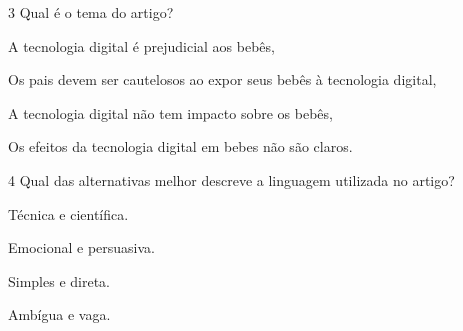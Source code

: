 \num{3} Qual é o tema do artigo?

\begin{escolha}
\item A tecnologia digital é prejudicial aos bebês,
\item Os pais devem ser cautelosos ao expor seus bebês à tecnologia
digital,
\item A tecnologia digital não tem impacto sobre os bebês,
\item Os efeitos da tecnologia digital em bebes não são claros.
\end{escolha}






\num{4} Qual das alternativas melhor descreve a linguagem utilizada no
artigo?

\begin{escolha}
\item Técnica e científica.
\item Emocional e persuasiva.
\item Simples e direta.
\item Ambígua e vaga.
\end{escolha}





